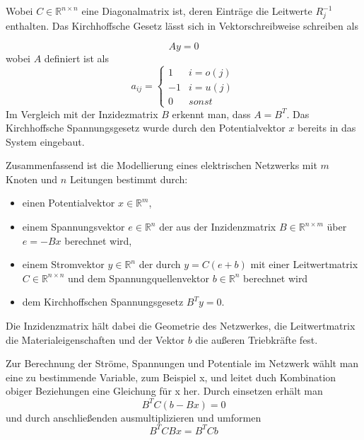 \documentclass[11pt,titlepage]{article}
\begin{document}
		Wobei $C \in \mathbb{R}^{n \times n}$ eine Diagonalmatrix ist, deren Einträge die Leitwerte $R_j^{-1}$ enthalten. Das Kirchhoffsche Gesetz lässt sich in Vektorschreibweise schreiben als
		
		\begin{displaymath}
			Ay = 0
		\end{displaymath}
		wobei $A$ definiert ist als
		\begin{displaymath}
			a_{ij} = 
			\begin{cases}
				1 &  i = o(j) \\
				-1 &  i = u(j) \\
				0 & sonst				
			\end{cases}
		\end{displaymath}
		Im Vergleich mit der Inzidezmatrix $B$ erkennt man, dass $A = B^T$.
		Das Kirchhoffsche Spannungsgesetz wurde durch den Potentialvektor $x$ bereits in das System eingebaut.
		
		Zusammenfassend ist die Modellierung eines elektrischen Netzwerks mit $m$ Knoten und $n$ Leitungen bestimmt durch:
		\begin{itemize}
			\item einen Potentialvektor $x \in \mathbb{R}^m$,
			\item einem Spannungsvektor $e \in \mathbb{R}^n$ der aus der Inzidenzmatrix $B \in \mathbb{R}^{n \times m}$ über $e = -Bx$ berechnet wird,
			\item einem Stromvektor $y \in \mathbb{R}^n$ der durch $y = C(e+b)$ mit einer Leitwertmatrix $C \in \mathbb{R}^{n \times n}$ und dem Spannungquellenvektor $b \in \mathbb{R}^n$ berechnet wird
			\item dem Kirchhoffschen Spannungsgesetz $B^T y = 0$.
		\end{itemize}
	
		Die Inzidenzmatrix hält dabei die Geometrie des Netzwerkes, die Leitwertmatrix die Materialeigenschaften und der Vektor $b$ die \grqq außeren Triebkräfte\glqq{} fest.
		
		Zur Berechnung der Ströme, Spannungen und Potentiale im Netzwerk wählt man eine zu bestimmende Variable, zum Beispiel x, und leitet duch Kombination obiger Beziehungen eine Gleichung für x her. 
		Durch einsetzen erhält man
		\begin{displaymath}
			B^T C (b-Bx)=0
		\end{displaymath}
		und durch anschließenden ausmultiplizieren und umformen
		\begin{displaymath}
			B^T C Bx = B^T C b
		\end{displaymath}
	
\end{document}
